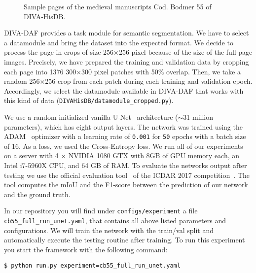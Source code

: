 \documentclass[runningheads]{llncs}
\begin{document}
\begin{figure*}[ht] 
    \centering
    
    \hfill
    
    \caption{
    Sample pages of the medieval manuscripts Cod. Bodmer 55 of DIVA-HisDB.
    }
    \label{fig:dataset}
\end{figure*}

DIVA-DAF provides a task module for semantic segmentation. We have to select a datamodule and bring the dataset into the expected format.
We decide to process the page in crops of size 256$\times$256 pixel because of the size of the full-page images. Precisely, we have prepared the training and validation data by cropping each page into 1376 300$\times$300 pixel patches with 50\% overlap. Then, we take a random 256$\times$256 crop from each patch during each training and validation epoch. Accordingly, we select the datamodule available in DIVA-DAF that works with this kind of data (\texttt{DIVAHisDB/datamodule\_cropped.py}). 

We use a random initialized vanilla U-Net~\cite{ronnebergerUnetConvolutionalNetworks2015} architecture ($\sim$31 million parameters), which has eight output layers.
The network was trained using the ADAM~\cite{kingmaAdamMethodStochastic2014} optimizer with a learning rate of \texttt{0.001} for \texttt{50} epochs with a batch size of 16.
As a loss, we used the Cross-Entropy loss.
We run all of our experiments on a server with 4 $\times$ NVIDIA 1080 GTX with 8GB of GPU memory each, an Intel i7-5960X CPU, and 64 GB of RAM.
To evaluate the networks output after testing we use the official evaluation tool~\cite{albertiOpenEvaluationTool2017a} of the ICDAR 2017 competition~\cite{simistiraICDAR2017CompetitionLayout2017}.
The tool computes the \ac{mIoU} and the F1-score between the prediction of our network and the ground truth.

In our repository you will find under \texttt{configs/experiment} a file \texttt{cb55\_full\_run\_unet.yaml}, that contains all above listed parameters and configurations.
We will train the network with the train/val split and automatically execute the testing routine after training.
To run this experiment you start the framework with the following command:
\begin{lstlisting}
$ python run.py experiment=cb55_full_run_unet.yaml
\end{lstlisting}
\end{document}
